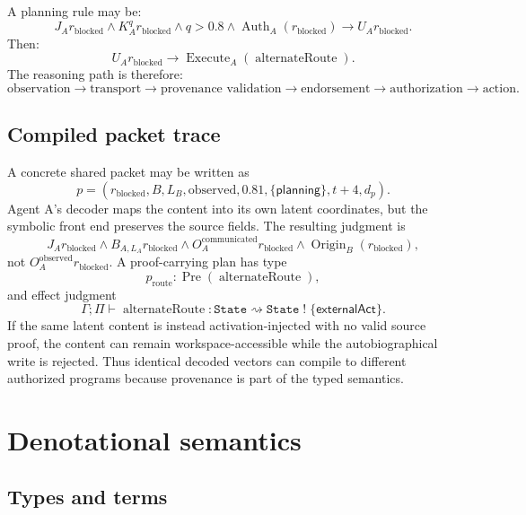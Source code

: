 \documentclass[11pt]{article}
\theoremstyle{definition}
\theoremstyle{remark}
\newcommand{\Auth}{\operatorname{Auth}}
\newcommand{\Origin}{\operatorname{Origin}}
\begin{document}
A planning rule may be:
\[
J_A r_{\mathrm{blocked}}
\wedge
K_A^{q}r_{\mathrm{blocked}}
\wedge
q>0.8
\wedge
\Auth_A(r_{\mathrm{blocked}})
\to
U_A r_{\mathrm{blocked}}.
\]
Then:
\[
U_A r_{\mathrm{blocked}}
\to
\operatorname{Execute}_A(\operatorname{alternateRoute}).
\]
The reasoning path is therefore:
\[
\text{observation}
\to
\text{transport}
\to
\text{provenance validation}
\to
\text{endorsement}
\to
\text{authorization}
\to
\text{action}.
\]

\subsection{Compiled packet trace}

A concrete shared packet may be written as
\[
p=
\left(
 r_{\mathrm{blocked}},
 B,
 L_B,
 \mathrm{observed},
 0.81,
 \{\mathsf{planning}\},
 t+4,
 d_p
\right).
\]
Agent A's decoder maps the content into its own latent coordinates, but the symbolic front end preserves the source fields. The resulting judgment is
\[
J_A r_{\mathrm{blocked}}
\wedge
B_{A,L_A}r_{\mathrm{blocked}}
\wedge
O_A^{\mathrm{communicated}}r_{\mathrm{blocked}}
\wedge
\Origin_B(r_{\mathrm{blocked}}),
\]
not \(O_A^{\mathrm{observed}}r_{\mathrm{blocked}}\). A proof-carrying plan has type
\[
p_{\mathrm{route}}:
\operatorname{Pre}
\left(
\operatorname{alternateRoute}
\right),
\]
and effect judgment
\[
\Gamma;\Pi\vdash
\operatorname{alternateRoute}:
\texttt{State}\rightsquigarrow\texttt{State}
\;!\;\{\mathsf{externalAct}\}.
\]
If the same latent content is instead activation-injected with no valid source proof, the content can remain workspace-accessible while the autobiographical write is rejected. Thus identical decoded vectors can compile to different authorized programs because provenance is part of the typed semantics.









\section{Denotational semantics}

\subsection{Types and terms}
\end{document}
